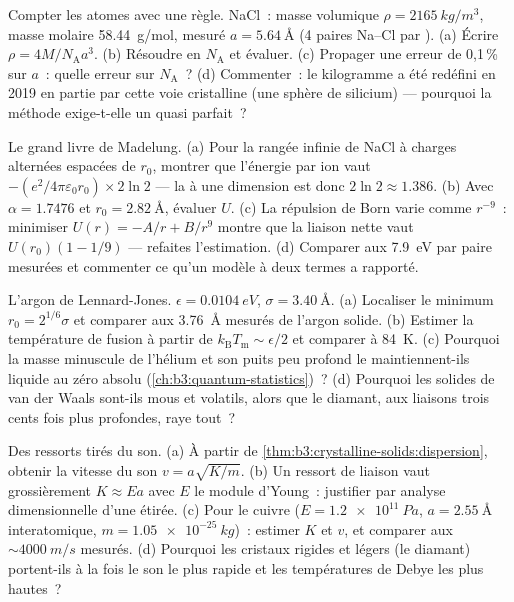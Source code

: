 \begin{exercise}[$\star\star$]\label{exo:b3:crystalline-solids:6}
Compter les atomes avec une règle. NaCl~: masse volumique
$\rho = \qty{2165}{kg/m^3}$, masse molaire \qty{58.44}{g/mol},
 mesuré $a = \qty{5.64}{\angstrom}$ (4 paires
Na--Cl par ). (a) Écrire $\rho = 4M/N_{\text{A}}a^3$. (b)
Résoudre en $N_{\text{A}}$ et évaluer. (c) Propager une erreur de
0,1\,\% sur $a$~: quelle erreur sur $N_{\text{A}}$~? (d) Commenter~:
le kilogramme a été redéfini en 2019 en partie par cette voie
cristalline (une sphère de silicium) --- pourquoi la méthode
exige-t-elle un  quasi parfait~?
\end{exercise}

\begin{exercise}[$\star\star$]\label{exo:b3:crystalline-solids:7}
Le grand livre de Madelung. (a) Pour la rangée infinie de NaCl à
charges alternées espacées de $r_0$, montrer que l'énergie par ion
vaut $-(e^2/4\pi\varepsilon_0r_0)\times2\ln2$ --- la  à une dimension est donc $2\ln2 \approx 1.386$. (b)
Avec $\alpha = 1.7476$ et $r_0 = \qty{2.82}{\angstrom}$, évaluer
$U$. (c) La répulsion de Born varie comme $r^{-9}$~: minimiser
$U(r) = -A/r + B/r^9$ montre que la liaison nette vaut
$U(r_0)(1 - 1/9)$ --- refaites l'estimation. (d) Comparer aux
\qty{7.9}{eV} par paire mesurées et commenter ce qu'un modèle à deux
termes a rapporté.
\end{exercise}

\begin{exercise}[$\star\star$]\label{exo:b3:crystalline-solids:8}
L'argon de Lennard-Jones. $\epsilon = \qty{0.0104}{eV}$, $\sigma =
\qty{3.40}{\angstrom}$. (a) Localiser le minimum $r_0 = 2^{1/6}
\sigma$ et comparer aux \qty{3.76}{\angstrom} mesurés de l'argon
solide. (b) Estimer la température de fusion à partir de
$k_{\text{B}}T_{\text{m}} \sim \epsilon/2$ et comparer à
\qty{84}{K}. (c) Pourquoi la masse minuscule de l'hélium et son puits
peu profond le maintiennent-ils liquide au zéro absolu
(\cref{ch:b3:quantum-statistics})~? (d) Pourquoi les solides de van
der Waals sont-ils mous et volatils, alors que le diamant, aux
liaisons trois cents fois plus profondes, raye tout~?
\end{exercise}

\begin{exercise}[$\star\star$]\label{exo:b3:crystalline-solids:9}
Des ressorts tirés du son. (a) À partir de
\cref{thm:b3:crystalline-solids:dispersion}, obtenir la vitesse du
son $v = a\sqrt{K/m}$. (b) Un ressort de liaison vaut grossièrement $K \approx
Ea$ avec $E$ le module d'Young~: justifier par analyse dimensionnelle
d'une  étirée. (c) Pour le cuivre ($E = \qty{1.2e11}{Pa}$,
$a = \qty{2.55}{\angstrom}$ interatomique, $m =
\qty{1.05e-25}{kg}$)~: estimer $K$ et $v$, et comparer aux
$\sim\qty{4000}{m/s}$ mesurés. (d) Pourquoi les cristaux rigides et
légers (le diamant) portent-ils à la fois le son le plus rapide et les
températures de Debye les plus hautes~?
\end{exercise}

